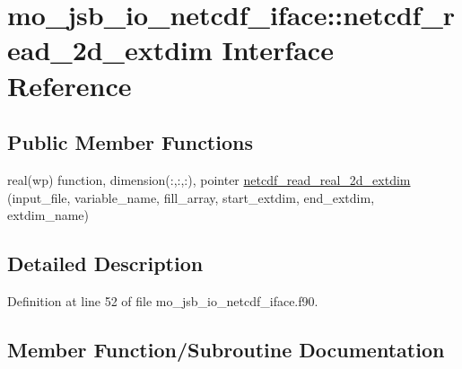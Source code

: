 \hypertarget{interfacemo__jsb__io__netcdf__iface_1_1netcdf__read__2d__extdim}{}\section{mo\+\_\+jsb\+\_\+io\+\_\+netcdf\+\_\+iface\+:\+:netcdf\+\_\+read\+\_\+2d\+\_\+extdim Interface Reference}
\label{interfacemo__jsb__io__netcdf__iface_1_1netcdf__read__2d__extdim}
\subsection*{Public Member Functions}
\begin{DoxyCompactItemize}
\item 
real(wp) function, dimension(\+:,\+:,\+:), pointer \hyperlink{interfacemo__jsb__io__netcdf__iface_1_1netcdf__read__2d__extdim_a760483359d8ff523e9c60f256f4a8bda}{netcdf\+\_\+read\+\_\+real\+\_\+2d\+\_\+extdim} (input\+\_\+file, variable\+\_\+name, fill\+\_\+array, start\+\_\+extdim, end\+\_\+extdim, extdim\+\_\+name)
\end{DoxyCompactItemize}


\subsection{Detailed Description}


Definition at line 52 of file mo\+\_\+jsb\+\_\+io\+\_\+netcdf\+\_\+iface.\+f90.



\subsection{Member Function/\+Subroutine Documentation}
\hypertarget{interfacemo__jsb__io__netcdf__iface_1_1netcdf__read__2d__extdim_a760483359d8ff523e9c60f256f4a8bda}{}
